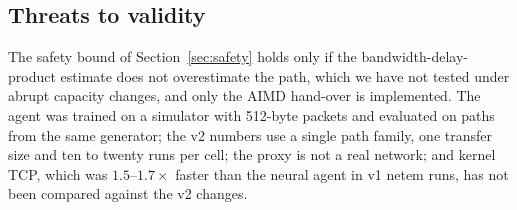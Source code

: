 \subsection{Threats to validity}
The safety bound of Section~\ref{sec:safety} holds only if the bandwidth-delay-product estimate does not overestimate the path, which we have not tested under abrupt capacity changes, and only the AIMD hand-over is implemented. The agent was trained on a simulator with 512-byte packets and evaluated on paths from the same generator; the v2 numbers use a single path family, one transfer size and ten to twenty runs per cell; the proxy is not a real network; and kernel TCP, which was $1.5$--$1.7\times$ faster than the neural agent in v1 netem runs, has not been compared against the v2 changes.
